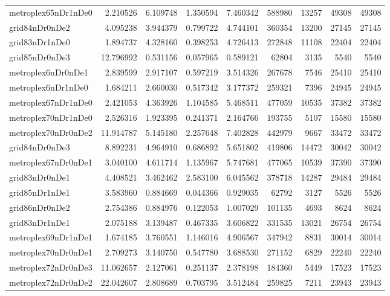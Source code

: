 \begin{longtable}{|l|r|r|r|r|r|r|r|r|}
metroplex65nDr1nDe0 & 2.210526 & 6.109748 & 1.350594 & 7.460342 & 588980 & 13257 & 49308 & 49308 \\
grid84nDr0nDe2 & 4.095238 & 3.944379 & 0.799722 & 4.744101 & 360354 & 13200 & 27145 & 27145 \\
grid83nDr1nDe0 & 1.894737 & 4.328160 & 0.398253 & 4.726413 & 272848 & 11108 & 22404 & 22404 \\
grid85nDr0nDe3 & 12.796992 & 0.531156 & 0.057965 & 0.589121 & 62804 & 3135 & 5540 & 5540 \\
metroplex6nDr0nDe1 & 2.839599 & 2.917107 & 0.597219 & 3.514326 & 267678 & 7546 & 25410 & 25410 \\
metroplex6nDr1nDe0 & 1.684211 & 2.660030 & 0.517342 & 3.177372 & 259321 & 7396 & 24945 & 24945 \\
metroplex67nDr1nDe0 & 2.421053 & 4.363926 & 1.104585 & 5.468511 & 477059 & 10535 & 37382 & 37382 \\
metroplex70nDr1nDe0 & 2.526316 & 1.923395 & 0.241371 & 2.164766 & 193755 & 5107 & 15580 & 15580 \\
metroplex70nDr0nDe2 & 11.914787 & 5.145180 & 2.257648 & 7.402828 & 442979 & 9667 & 33472 & 33472 \\
grid84nDr0nDe3 & 8.892231 & 4.964910 & 0.686892 & 5.651802 & 419806 & 14472 & 30042 & 30042 \\
metroplex67nDr0nDe1 & 3.040100 & 4.611714 & 1.135967 & 5.747681 & 477065 & 10539 & 37390 & 37390 \\
grid83nDr0nDe1 & 4.408521 & 3.462462 & 2.583100 & 6.045562 & 378718 & 14287 & 29484 & 29484 \\
grid85nDr1nDe1 & 3.583960 & 0.884669 & 0.044366 & 0.929035 & 62792 & 3127 & 5526 & 5526 \\
grid86nDr0nDe2 & 2.754386 & 0.884976 & 0.122053 & 1.007029 & 101135 & 4693 & 8624 & 8624 \\
grid83nDr1nDe1 & 2.075188 & 3.139487 & 0.467335 & 3.606822 & 331535 & 13021 & 26754 & 26754 \\
metroplex69nDr1nDe1 & 1.674185 & 3.760551 & 1.146016 & 4.906567 & 347942 & 8831 & 30014 & 30014 \\
metroplex70nDr0nDe1 & 2.709273 & 3.140750 & 0.547780 & 3.688530 & 271152 & 6829 & 22240 & 22240 \\
metroplex72nDr0nDe3 & 11.062657 & 2.127061 & 0.251137 & 2.378198 & 184360 & 5449 & 17523 & 17523 \\
metroplex72nDr0nDe2 & 22.042607 & 2.808689 & 0.703795 & 3.512484 & 259825 & 7211 & 23943 & 23943 \\

\end{longtable}
